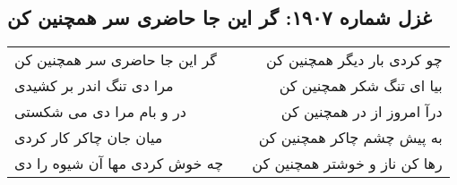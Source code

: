 \begin{center}
\section*{غزل شماره ۱۹۰۷: گر این جا حاضری سر همچنین کن}
\label{sec:1907}
\begin{longtable}{l p{0.5cm} r}
گر این جا حاضری سر همچنین کن
&&
چو کردی بار دیگر همچنین کن
\\
مرا دی تنگ اندر بر کشیدی
&&
بیا ای تنگ شکر همچنین کن
\\
در و بام مرا دی می شکستی
&&
درآ امروز از در همچنین کن
\\
میان جان چاکر کار کردی
&&
به پیش چشم چاکر همچنین کن
\\
چه خوش کردی مها آن شیوه را دی
&&
رها کن ناز و خوشتر همچنین کن
\\
\end{longtable}
\end{center}

